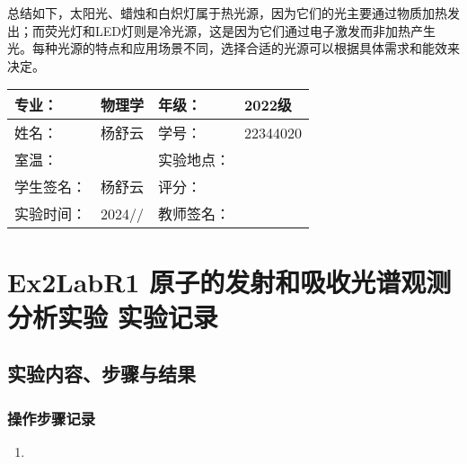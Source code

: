 \documentclass[dvipsnames, svgnames,a4paper,11pt]{article}
\begin{document}
	总结如下，太阳光、蜡烛和白炽灯属于热光源，因为它们的光主要通过物质加热发出；而荧光灯和LED灯则是冷光源，这是因为它们通过电子激发而非加热产生光。每种光源的特点和应用场景不同，选择合适的光源可以根据具体需求和能效来决定。
	
	
	
	
	
	\clearpage
	
	\begin{table}
		\renewcommand\arraystretch{1.7}
		\centering
		\begin{tabularx}{\textwidth}{|X|X|X|X|}
			\hline
			专业： & 物理学 & 年级： & 2022级 \\
			\hline
			姓名： & 杨舒云 & 学号： & 22344020\\
			\hline
			室温： &  & 实验地点： &  \\
			\hline
			学生签名：& 杨舒云 & 评分： &\\
			\hline
			实验时间：& 2024// & 教师签名：&\\
			\hline
		\end{tabularx}
	\end{table}
	
	\section{Ex2LabR1 原子的发射和吸收光谱观测分析实验  \quad\heiti 实验记录}
	
	\subsection{实验内容、步骤与结果}
	
	\subsubsection{操作步骤记录}
	\begin{enumerate}
		\item 
	\end{enumerate}	
	
\end{document}
